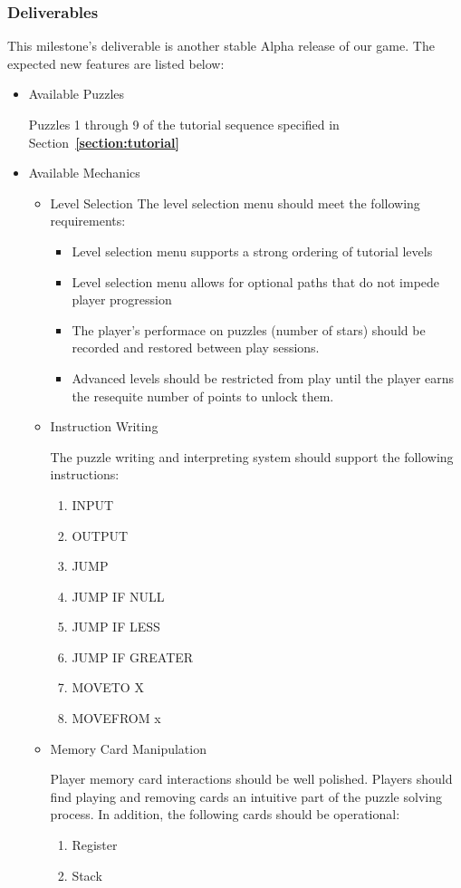 \subsubsection*{Deliverables}
This milestone’s deliverable is another stable Alpha release of our game. The expected new features are listed below:

\begin{itemize}

  \item Available Puzzles
  
  Puzzles 1 through 9 of the tutorial sequence specified in Section~\textbf{\ref{section:tutorial}}

  \item Available Mechanics
  \begin{itemize}
    \item Level Selection
    The level selection menu should meet the following requirements:
    \begin{itemize}
      \item Level selection menu supports a strong ordering of tutorial levels
      \item Level selection menu allows for optional paths that do not impede player progression
      \item The player's performace on puzzles (number of stars) should be recorded and restored between play sessions.
      \item Advanced levels should be restricted from play until the player earns the resequite number of points to unlock them.
    \end{itemize}

    \item Instruction Writing
    
    The puzzle writing and interpreting system should support the following instructions:

    \begin{enumerate}
      \item INPUT
      \item OUTPUT
      \item JUMP
      \item JUMP IF NULL
      \item JUMP IF LESS
      \item JUMP IF GREATER
      \item MOVETO X
      \item MOVEFROM x
    \end{enumerate}

    \item Memory Card Manipulation
    
    Player memory card interactions should be well polished. Players should find playing and removing cards an intuitive part of the puzzle solving process. In addition, the following cards should be operational:

    \begin{enumerate}
      \item Register
      \item Stack
    \end{enumerate}
  \end{itemize}
\end{itemize}

